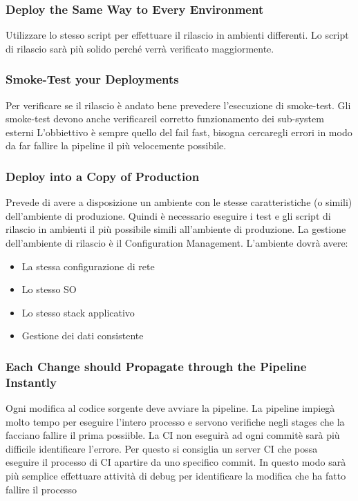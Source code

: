 \subsubsection{Deploy the Same Way to Every Environment}
Utilizzare lo stesso script per effettuare il rilascio in ambienti differenti.
Lo script di rilascio sarà più solido perché verrà verificato maggiormente.

\subsubsection{Smoke-Test your Deployments}
Per verificare se il rilascio è andato bene prevedere l’esecuzione di smoke-test.
Gli smoke-test devono anche verificareil corretto funzionamento dei sub-system esterni
L’obbiettivo è sempre quello del fail fast, bisogna cercaregli errori in modo da far fallire la pipeline il più velocemente possibile.

\subsubsection{Deploy into a Copy of Production}
Prevede di avere a disposizione un ambiente con le stesse caratteristiche (o simili) dell’ambiente di produzione.
Quindi è necessario eseguire i test e gli script di rilascio in ambienti il più possibile simili all’ambiente di produzione.
La gestione dell’ambiente di rilascio è il Configuration Management.
L’ambiente dovrà avere:
\begin{itemize}
    \item La stessa configurazione di rete
    \item Lo stesso SO
    \item Lo stesso stack applicativo
    \item Gestione dei dati consistente
\end{itemize}

\subsubsection{Each Change should Propagate through the Pipeline Instantly}
Ogni modifica al codice sorgente deve avviare la pipeline.
La pipeline impiegà molto tempo per eseguire l’intero processo e servono verifiche negli stages che la facciano fallire il prima possiible.
La CI non eseguirà ad ogni commitè sarà più difficile identificare l’errore.
Per questo si consiglia un server CI che possa eseguire il processo di CI apartire da uno specifico commit.
In questo modo sarà più semplice effettuare attività di debug per identificare la modifica che ha fatto fallire il processo

